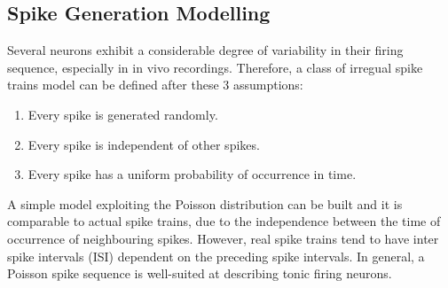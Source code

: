 \subsection{Spike Generation Modelling}
Several neurons exhibit a considerable degree of variability in their firing
sequence, especially in in vivo recordings. Therefore, a class of irregual
spike trains model can be defined after these 3 assumptions:
\begin{enumerate}
    \item Every spike is generated randomly.
    \item Every spike is independent of other spikes.
    \item Every spike has a uniform probability of occurrence in time.
\end{enumerate}
A simple model exploiting the Poisson distribution can be built and it is comparable
to actual spike trains, due to the independence between the time of occurrence of
neighbouring spikes. However, real spike trains tend to have inter spike intervals
(ISI) dependent on the preceding spike intervals.
In general, a Poisson spike sequence is well-suited at describing tonic firing
neurons.
